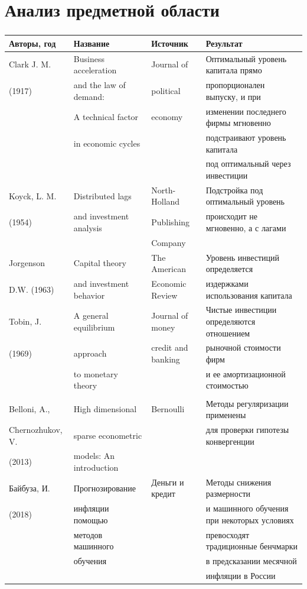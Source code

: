 \documentclass[c, dvipsnames]{beamer}  %
\begin{document}
\section{Анализ предметной области}
\begin{frame}[shrink = 40]
 \frametitle{\insertsection} 

\begin{table}[ht]
\centering
\begin{tabular}{llll}
  \hline
Авторы, год & Название & Источник & Результат  \\ 
  \hline
Clark J. M. & Business acceleration & Journal of & Оптимальный уровень капитала прямо \\
(1917) & and  the law of demand: & political&   пропорционален выпуску, и при\\
& A technical factor  & economy  & изменении последнего фирмы мгновенно \\
&in economic cycles  & &  подстраивают уровень капитала \\
& & & под оптимальный через инвестиции\\
\hline
Koyck, L. M.  & Distributed lags  & North-Holland & Подстройка под оптимальный уровень\\
(1954)& and investment analysis & Publishing  &  происходит не мгновенно, а с лагами\\
& &   Company & \\
\hline
Jorgenson &  Capital theory & The American & Уровень инвестиций определяется\\
D.W. (1963)  & and investment behavior  &Economic Review  & издержками использования капитала\\
\hline

Tobin, J. &  A general equilibrium & Journal of money & Чистые инвестиции определяются отношением \\
(1969) &  approach  & credit and banking& рыночной стоимости фирм\\
&
to monetary theory
&
&
и ее амортизационной стоимостью
\\
\hline 
&
&
&
\\
\hline
Belloni, A., & High dimensional  & Bernoulli & Методы регуляризации применены \\
Chernozhukov, V.&  sparse econometric & &для проверки гипотезы конвергенции \\
(2013)
&  models: An introduction
& 
&
\\

\hline

Байбуза, И.  & Прогнозирование  & Деньги и кредит & Методы снижения размерности \\
(2018)
&
инфляции помощью
&
&
и машинного обучения при некоторых условиях\\
&
методов машинного
&
&
превосходят традиционные бенчмарки \\
& обучения
&
& в предсказании месячной \\
&
&
&
инфляции в России \\



   
\end{tabular}
\end{table}
\end{frame}
\end{document}
